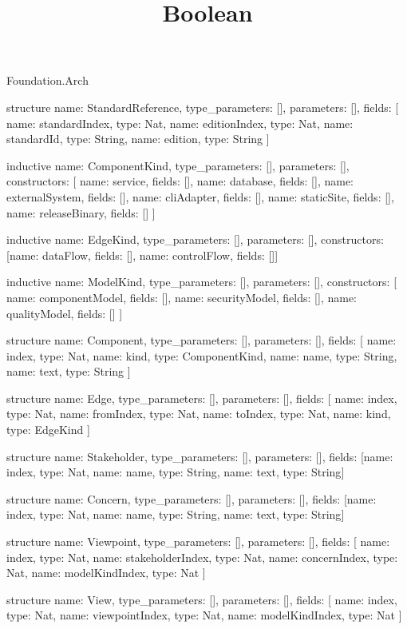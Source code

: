 \begin{lexlean}{Foundation.Arch}
\title{Boolean}
\begin{semanticmodule}
structure{
  name: StandardReference,
  type_parameters: [],
  parameters: [],
  fields: [
    {name: standardIndex, type: Nat},
    {name: editionIndex, type: Nat},
    {name: standardId, type: String},
    {name: edition, type: String}
  ]
}

inductive{
  name: ComponentKind,
  type_parameters: [],
  parameters: [],
  constructors: [
    {name: service, fields: []},
    {name: database, fields: []},
    {name: externalSystem, fields: []},
    {name: cliAdapter, fields: []},
    {name: staticSite, fields: []},
    {name: releaseBinary, fields: []}
  ]
}

inductive{
  name: EdgeKind,
  type_parameters: [],
  parameters: [],
  constructors: [{name: dataFlow, fields: []}, {name: controlFlow, fields: []}]
}

inductive{
  name: ModelKind,
  type_parameters: [],
  parameters: [],
  constructors: [
    {name: componentModel, fields: []},
    {name: securityModel, fields: []},
    {name: qualityModel, fields: []}
  ]
}

structure{
  name: Component,
  type_parameters: [],
  parameters: [],
  fields: [
    {name: index, type: Nat},
    {name: kind, type: ComponentKind},
    {name: name, type: String},
    {name: text, type: String}
  ]
}

structure{
  name: Edge,
  type_parameters: [],
  parameters: [],
  fields: [
    {name: index, type: Nat},
    {name: fromIndex, type: Nat},
    {name: toIndex, type: Nat},
    {name: kind, type: EdgeKind}
  ]
}

structure{
  name: Stakeholder,
  type_parameters: [],
  parameters: [],
  fields: [{name: index, type: Nat}, {name: name, type: String}, {name: text, type: String}]
}

structure{
  name: Concern,
  type_parameters: [],
  parameters: [],
  fields: [{name: index, type: Nat}, {name: name, type: String}, {name: text, type: String}]
}

structure{
  name: Viewpoint,
  type_parameters: [],
  parameters: [],
  fields: [
    {name: index, type: Nat},
    {name: stakeholderIndex, type: Nat},
    {name: concernIndex, type: Nat},
    {name: modelKindIndex, type: Nat}
  ]
}

structure{
  name: View,
  type_parameters: [],
  parameters: [],
  fields: [
    {name: index, type: Nat},
    {name: viewpointIndex, type: Nat},
    {name: modelKindIndex, type: Nat}
  ]
}


\end{semanticmodule}
\end{lexlean}
